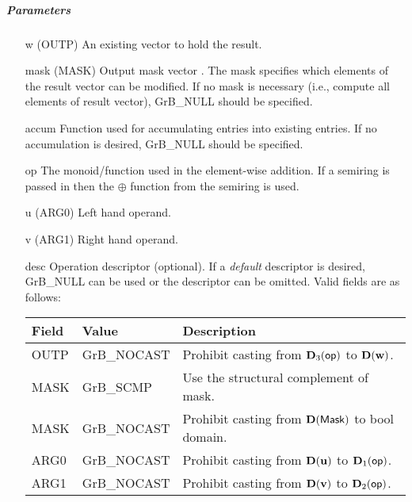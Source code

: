 \subparagraph{Parameters}

\begin{itemize}[leftmargin=1.1in]
    \item[{\sf w}]     ({\sf OUTP}) An existing vector to hold the result.

    \item[{\sf mask}] ({\sf MASK}) Output mask vector . The mask
    specifies which elements of the result vector can be modified.
    If no mask is necessary (i.e., compute all elements of result
    vector), {\sf GrB\_NULL} should be specified.

    \item[{\sf accum}]  Function used for accumulating entries into existing
                         entries. If no accumulation is desired,
                        {\sf GrB\_NULL} should be specified.

    \item[{\sf op}]    The monoid/function used in the element-wise addition.
                       If a semiring is passed in then the $\oplus$  function from
                                    the semiring is used.
    \item[{\sf u}]     ({\sf ARG0}) Left hand operand.
    \item[{\sf v}]     ({\sf ARG1}) Right hand operand.

    \item[{\sf desc}]  Operation descriptor (optional). If a
    \emph{default} descriptor is desired, {\sf GrB\_NULL} can be
    used or the descriptor can be omitted. Valid fields are as follows: \\
    \begin{tabular}{lll}
    Field  & Value & Description \\
    \hline
    {\sf OUTP} & {\sf GrB\_NOCAST} & Prohibit casting from $\bold{D}_3({\sf op})$ to $\bold{D}({\bf w})$. \\
    {\sf MASK} & {\sf GrB\_SCMP} & Use the structural complement of {\sf mask}. \\
    {\sf MASK} & {\sf GrB\_NOCAST} & Prohibit casting from $\bold{D}({\sf Mask})$ to {\sf bool} domain. \\
    {\sf ARG0} & {\sf GrB\_NOCAST} & Prohibit casting from $\bold{D}({\bf u})$ to $\bold{D}_1({\sf op})$. \\
    {\sf ARG1} & {\sf GrB\_NOCAST} & Prohibit casting from $\bold{D}({\bf v})$ to $\bold{D}_2({\sf op})$. \\
    \end{tabular}
\end{itemize}

